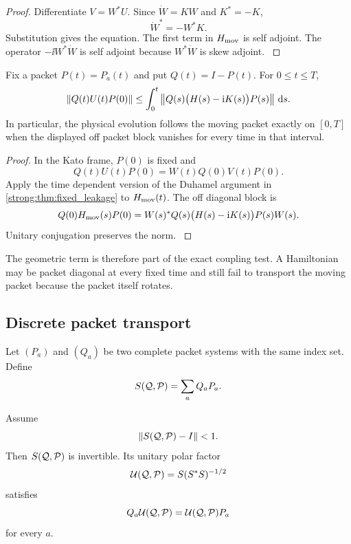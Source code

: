 \begin{proof}\label{strong:proof:023}
Differentiate \(V=W^*U\). Since \(\dot W=KW\) and \(K^*=-K\),
\[
\dot W^*=-W^*K.
\]
Substitution gives the equation. The first term in \(H_{\rm mov}\) is self adjoint. The operator \(-\ii W^*\dot W\) is self adjoint because \(W^*\dot W\) is skew adjoint.
\label{strong:proof:023:end}\end{proof}

\begin{theorem}\label{strong:theorem:015}\label{strong:thm:moving_leakage}
Fix a packet \(P(t)=P_a(t)\) and put \(Q(t)=I-P(t)\). For \(0\leq t\leq T\),
\[
\left\lVert Q(t)U(t)P(0)\right\rVert
\leq
\int_0^t
\left\lVert Q(s)\bigl(H(s)-\mathrm i K(s)\bigr)P(s)\right\rVert
\,\mathrm d s.
\]
In particular, the physical evolution follows the moving packet exactly on \([0,T]\) when the displayed off packet block vanishes for every time in that interval.
\end{theorem}

\begin{proof}\label{strong:proof:024}
In the Kato frame, \(P(0)\) is fixed and
\[
Q(t)U(t)P(0)
=
W(t)Q(0)V(t)P(0).
\]
Apply the time dependent version of the Duhamel argument in \cref{strong:thm:fixed_leakage} to \(H_{\rm mov}(t)\). The off diagonal block is
\[
Q(0)H_{\rm mov}(s)P(0)
=
W(s)^*Q(s)\bigl(H(s)-\mathrm i K(s)\bigr)P(s)W(s).
\]
Unitary conjugation preserves the norm.
\label{strong:proof:024:end}\end{proof}

The geometric term is therefore part of the exact coupling test. A Hamiltonian may be packet diagonal at every fixed time and still fail to transport the moving packet because the packet itself rotates.

\subsection{Discrete packet transport}\label{strong:subsec:discrete_transport}

Let \((P_a)\) and \((Q_a)\) be two complete packet systems with the same index set. Define
\[
S(\mathcal Q,\mathcal P)=\sum_aQ_aP_a.
\]

\begin{theorem}\label{strong:theorem:016}\label{strong:thm:direct_rotation}
Assume
\[
\left\lVert S(\mathcal Q,\mathcal P)-I\right\rVert<1.
\]
Then \(S(\mathcal Q,\mathcal P)\) is invertible. Its unitary polar factor
\[
\mathcal U(\mathcal Q,\mathcal P)
=
S(S^*S)^{-1/2}
\]
satisfies
\[
Q_a\mathcal U(\mathcal Q,\mathcal P)
=
\mathcal U(\mathcal Q,\mathcal P)P_a
\]
for every \(a\).
\end{theorem}

